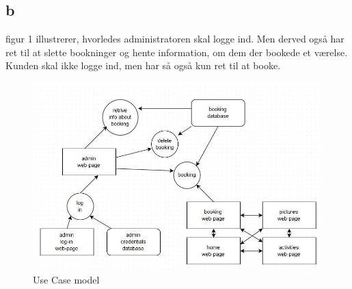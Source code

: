 \documentclass[12pt,a4paper]{article}
\begin{document}
\subsection{b}
figur 1 illustrerer, hvorledes administratoren skal logge ind. Men derved også har ret til at slette bookninger og hente information, om dem der bookede et værelse. Kunden skal ikke logge ind, men har så også kun ret til at booke.\\ 
\begin{figure}[H]
\includegraphics[scale=0.7]{useCaseModel.jpg}
\caption{Use Case model}
\end{figure}
\end{document}
